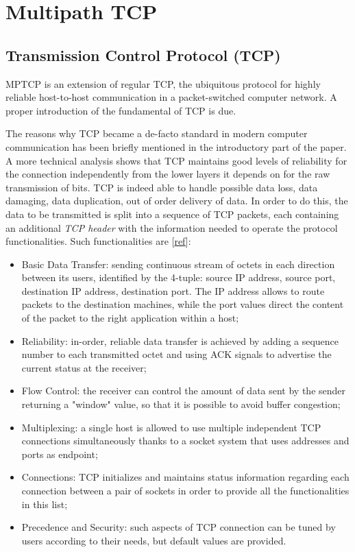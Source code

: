 \chapter{Multipath TCP}
\label{chap:multipathtcp}

\section{Transmission Control Protocol (TCP)}
MPTCP is an extension of regular TCP, the ubiquitous protocol for highly reliable host-to-host communication in a packet-switched computer network. A proper introduction of the fundamental of TCP is due.


The reasons why TCP became a de-facto standard in modern computer communication has been briefly mentioned in the introductory part of the paper. A more technical analysis shows that TCP maintains good levels of reliability for the connection independently from the lower layers it depends on for the raw transmission of bits. TCP is indeed able to handle possible data loss, data damaging, data duplication, out of order delivery of data. In order to do this, the data to be transmitted is split into a sequence of TCP packets, each containing an additional \textit{TCP header} with the information needed to operate the protocol functionalities. Such functionalities are [\href{https://tools.ietf.org/html/rfc793}{ref}]:

\begin{itemize}
  \item Basic Data Transfer: sending continuous stream of octets in each direction between its users, identified by the 4-tuple: source IP address, source port, destination IP address, destination port. The IP address allows to route packets to the destination machines, while the port values direct the content of the packet to the right application within a host;
  \item Reliability: in-order, reliable data transfer is achieved by adding a sequence number to each transmitted octet and using ACK signals to advertise the current status at the receiver;
  \item Flow Control: the receiver can control the amount of data sent by the sender returning a "window" value, so that it is possible to avoid buffer congestion;
  \item Multiplexing: a single host is allowed to use multiple independent TCP connections simultaneously thanks to a socket system that uses addresses and ports as endpoint;
  \item Connections: TCP initializes and maintains status information regarding each connection between a pair of sockets in order to provide all the functionalities in this list;
  \item Precedence and Security: such aspects of TCP connection can be tuned by users according to their needs, but default values are provided.
\end{itemize}


